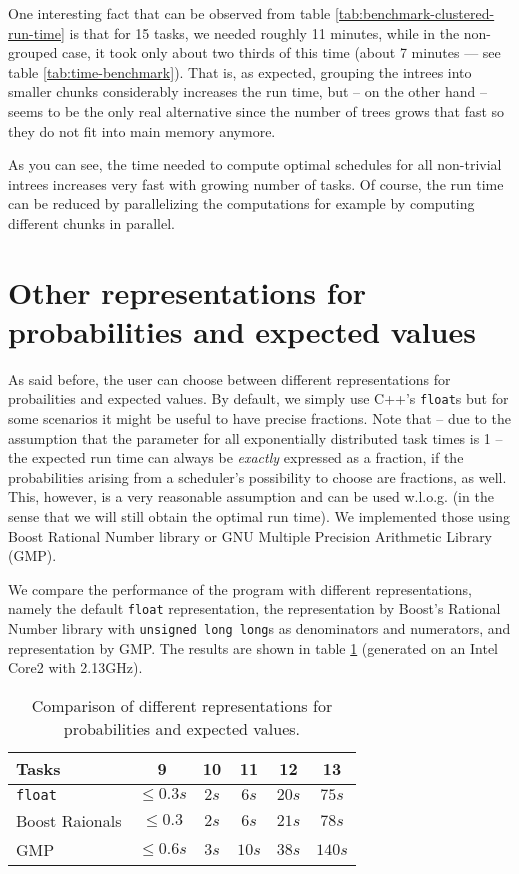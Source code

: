 One interesting fact that can be observed from table \ref{tab:benchmark-clustered-run-time} is that for 15 tasks, we needed roughly 11 minutes, while in the non-grouped case, it took only about two thirds of this time (about 7 minutes --- see table \ref{tab:time-benchmark}). That is, as expected, grouping the intrees into smaller chunks considerably increases the run time, but -- on the other hand -- seems to be the only real alternative since the number of trees grows that fast so they do not fit into main memory anymore.

As you can see, the time needed to compute optimal schedules for all non-trivial intrees increases very fast with growing number of tasks. Of course, the run time can be reduced by parallelizing the computations for example by computing different chunks in parallel.

\section{Other representations for probabilities and expected values}
\label{sec:benchmarks-myfloat-variations}

As said before, the user can choose between different representations for probailities and expected values. By default, we simply use C++'s \texttt{float}s but for some scenarios it might be useful to have precise fractions. Note that -- due to the assumption that the parameter for all exponentially distributed task times is 1 -- the expected run time can always be \emph{exactly} expressed as a fraction, if the probabilities arising from a scheduler's possibility to choose are fractions, as well. This, however, is a very reasonable assumption and can be used w.l.o.g. (in the sense that we will still obtain the optimal run time).
We implemented those using Boost Rational Number library or GNU Multiple Precision Arithmetic Library (GMP).

We compare the performance of the program with different representations, namely the default \texttt{float} representation, the representation by Boost's Rational Number library with \texttt{unsigned long long}s as denominators and numerators, and representation by GMP. The results are shown in table \ref{tab:comparison-myfloat-variants} (generated on an Intel Core2 with 2.13GHz).

\begin{table}[th]
  \centering
  \begin{tabular}[ht]{lccccc}
    Tasks & 9 & 10 & 11 & 12 & 13 \\
    \hline 
    \texttt{float} & $\leq 0.3s$ & $2s$ & $6s$ & $20s$ & $75s$ \\
    Boost Raionals & $\leq 0.3$ & $2s$ & $6s$ & $21s$ & $78s$ \\
    GMP & $\leq 0.6s$ & $3s$ & $10s$ & $38s$ & $140s$
  \end{tabular}
  \caption{Comparison of different representations for probabilities and expected values.}
  \label{tab:comparison-myfloat-variants}
\end{table}

